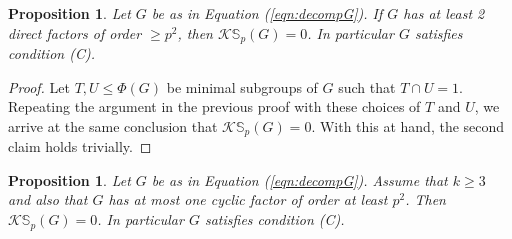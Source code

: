 \documentclass[12pt]{article}
\theoremstyle{plain}
\newtheorem{proposition}[theorem]{Proposition}
\theoremstyle{definition}
\newcommand{\kerlin}{\mathbb S_p}
\begin{document}
\begin{proposition}\label{pro:2Cpk}
     Let $G$ be as in Equation (\ref{eqn:decompG}). If $G$ has at least 2 direct factors of order $\ge p^2$, then $\mathcal K\kerlin(G) = 0$. In particular $G$ satisfies condition (C). 
     \end{proposition}

\begin{proof}
    Let $T, U\le \Phi(G)$ be minimal subgroups of $G$ such that $T\cap U =1$. Repeating the argument in the previous proof with these choices of $T$ and $U$, we arrive at the same conclusion that $\mathcal K\kerlin(G) = 0$. With this at hand, the second claim holds trivially. 
\end{proof}
\begin{proposition}\label{pro:1Cpk2Cp}
    Let $G$ be as in Equation (\ref{eqn:decompG}). Assume that $k\ge 3$ and also that $G$ has at most one cyclic factor of order at least $p^2$. Then $\mathcal K\kerlin(G) = 0$. In particular $G$ satisfies condition (C).
\end{proposition}
\end{document}
